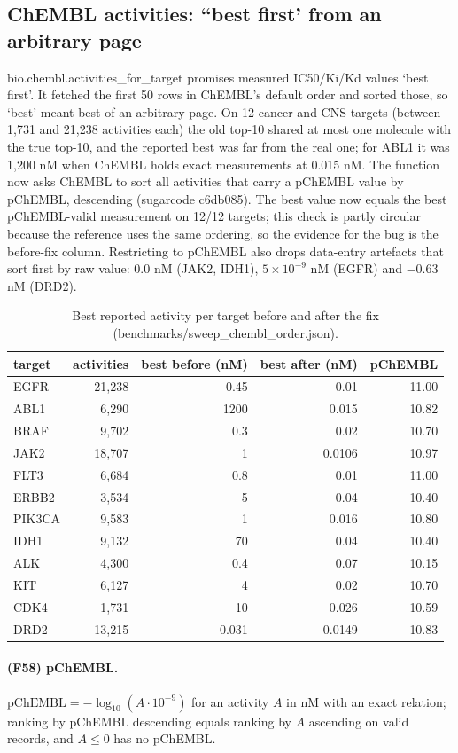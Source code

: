 \subsection{ChEMBL activities: ``best first' from an arbitrary page}
bio.chembl.activities\_for\_target promises measured IC50/Ki/Kd values `best first'. It fetched the first 50 rows in ChEMBL's default order and sorted those, so `best' meant best of an arbitrary page. On 12 cancer and CNS targets (between 1,731 and 21,238 activities each) the old top-10 shared at most one molecule with the true top-10, and the reported best was far from the real one; for ABL1 it was 1,200 nM when ChEMBL holds exact measurements at 0.015 nM. The function now asks ChEMBL to sort all activities that carry a pChEMBL value by pChEMBL, descending (sugarcode c6db085). The best value now equals the best pChEMBL-valid measurement on 12/12 targets; this check is partly circular because the reference uses the same ordering, so the evidence for the bug is the before-fix column. Restricting to pChEMBL also drops data-entry artefacts that sort first by raw value: 0.0 nM (JAK2, IDH1), $5\times10^{-9}$ nM (EGFR) and $-0.63$ nM (DRD2).
\begin{table}[h]\centering\small\begin{tabular}{lrrrr}\hline target & activities & best before (nM) & best after (nM) & pChEMBL\\\hline
EGFR & 21,238 & 0.45 & 0.01 & 11.00\\
ABL1 & 6,290 & 1200 & 0.015 & 10.82\\
BRAF & 9,702 & 0.3 & 0.02 & 10.70\\
JAK2 & 18,707 & 1 & 0.0106 & 10.97\\
FLT3 & 6,684 & 0.8 & 0.01 & 11.00\\
ERBB2 & 3,534 & 5 & 0.04 & 10.40\\
PIK3CA & 9,583 & 1 & 0.016 & 10.80\\
IDH1 & 9,132 & 70 & 0.04 & 10.40\\
ALK & 4,300 & 0.4 & 0.07 & 10.15\\
KIT & 6,127 & 4 & 0.02 & 10.70\\
CDK4 & 1,731 & 10 & 0.026 & 10.59\\
DRD2 & 13,215 & 0.031 & 0.0149 & 10.83\\
\hline\end{tabular}\caption{Best reported activity per target before and after the fix (benchmarks/sweep\_chembl\_order.json).}\end{table}
\paragraph{(F58) pChEMBL.} $\mathrm{pChEMBL}=-\log_{10}(A\cdot10^{-9})$ for an activity $A$ in nM with an exact relation; ranking by pChEMBL descending equals ranking by $A$ ascending on valid records, and $A\le0$ has no pChEMBL.

